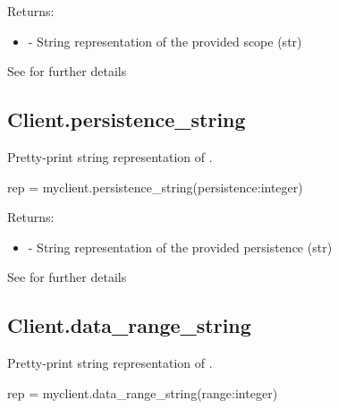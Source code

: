 Returns:
\begin{itemize}
    \item {} - String representation of the provided scope (str)
\end{itemize}

See  for further details


\subsection{Client.persistence_string}

\summary

Pretty-print string representation of .

\format

\pyspecificstart
\begin{codepar}
rep = myclient.persistence_string(persistence:integer)
\end{codepar}
\pyspecificend

\begin{arglist}
\end{arglist}

Returns:
\begin{itemize}
    \item {} - String representation of the provided persistence (str)
\end{itemize}

See  for further details


\subsection{Client.data_range_string}

\summary

Pretty-print string representation of .

\format

\pyspecificstart
\begin{codepar}
rep = myclient.data_range_string(range:integer)
\end{codepar}
\pyspecificend

\begin{arglist}
\end{arglist}


